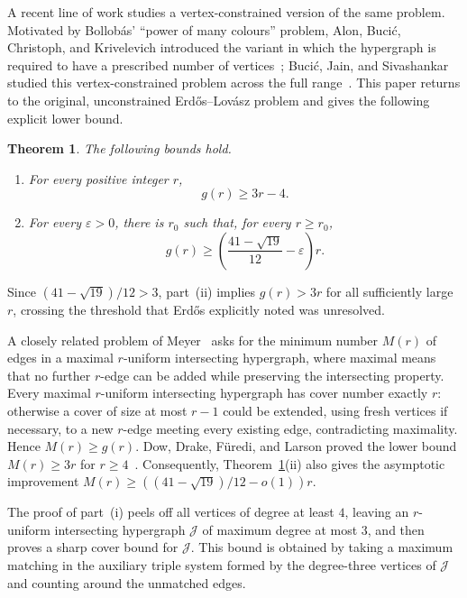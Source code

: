 \documentclass[11pt]{amsart}
\newtheorem{theorem}{Theorem}
\theoremstyle{remark}
\newcommand{\cJ}{\mathcal J}
\begin{document}
A recent line of work studies a vertex-constrained version of the same
problem.  Motivated by Bollob\'as' ``power of many colours'' problem, Alon,
Buci\'c, Christoph, and Krivelevich introduced the variant in which the
hypergraph is required to have a prescribed number of
vertices~\cite{PowerManyColours}; Buci\'c, Jain, and Sivashankar studied this
vertex-constrained problem across the full range~\cite{BJS}.  This
paper returns to the original, unconstrained Erd\H{o}s--Lov\'asz
problem and gives the following explicit lower bound.

\begin{theorem}\label{thm:main}
The following bounds hold.
\begin{enumerate}
\item[(i)] For every positive integer $r$,
\[
  g(r)\ge 3r-4.
\]
\item[(ii)] For every $\varepsilon>0$, there is $r_0$ such that, for every
$r\ge r_0$,
\[
  g(r)\ge \left(\frac{41-\sqrt{19}}{12}-\varepsilon\right)r.
\]
\end{enumerate}
\end{theorem}

Since $(41-\sqrt{19})/12>3$, part~(ii) implies $g(r)>3r$ for all
sufficiently large $r$, crossing the threshold that Erd\H{o}s explicitly
noted was unresolved.

A closely related problem of Meyer~\cite{Meyer} asks for the minimum number
$M(r)$ of edges in a maximal $r$-uniform intersecting hypergraph, where
maximal means that no further $r$-edge can be added while preserving the
intersecting property.  Every maximal $r$-uniform intersecting hypergraph has
cover number exactly $r$: otherwise a cover of size at most $r-1$ could be
extended, using fresh vertices if necessary, to a new $r$-edge meeting every
existing edge, contradicting maximality.  Hence $M(r)\ge g(r)$.  Dow, Drake,
F\"uredi, and Larson proved the lower bound $M(r)\ge 3r$ for
$r\ge 4$~\cite{DDFL}.  Consequently, Theorem~\ref{thm:main}(ii) also gives the
asymptotic improvement
$M(r)\ge ((41-\sqrt{19})/12-o(1))r$.

The proof of part~(i) peels off all vertices of degree at least $4$, leaving
an $r$-uniform intersecting
hypergraph $\cJ$ of maximum degree at most $3$, and then proves a sharp cover
bound for $\cJ$.  This bound is obtained by taking a maximum matching in the
auxiliary triple system formed by the degree-three vertices of $\cJ$ and
counting around the unmatched edges.
\end{document}

